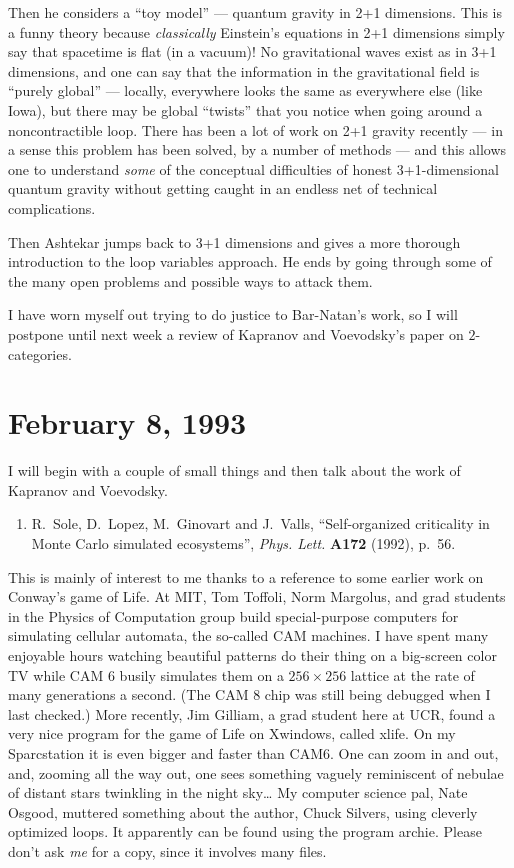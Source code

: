 \documentclass{article}
\def\tightlist{}
\begin{document}
Then he considers a ``toy model'' --- quantum gravity in 2+1 dimensions.
This is a funny theory because \emph{classically} Einstein's equations
in 2+1 dimensions simply say that spacetime is flat (in a vacuum)! No
gravitational waves exist as in 3+1 dimensions, and one can say that the
information in the gravitational field is ``purely global'' --- locally,
everywhere looks the same as everywhere else (like Iowa), but there may
be global ``twists'' that you notice when going around a noncontractible
loop. There has been a lot of work on 2+1 gravity recently --- in a
sense this problem has been solved, by a number of methods --- and this
allows one to understand \emph{some} of the conceptual difficulties of
honest 3+1-dimensional quantum gravity without getting caught in an
endless net of technical complications.

Then Ashtekar jumps back to 3+1 dimensions and gives a more thorough
introduction to the loop variables approach. He ends by going through
some of the many open problems and possible ways to attack them.

I have worn myself out trying to do justice to Bar-Natan's work, so I
will postpone until next week a review of Kapranov and Voevodsky's paper
on \(2\)-categories.



\hypertarget{week4}{%
\section{February 8, 1993}\label{week4}}

I will begin with a couple of small things and then talk about the work
of Kapranov and Voevodsky.

\begin{enumerate}
\def\labelenumi{\arabic{enumi})}
\tightlist
\item
  R.\ Sole, D.\ Lopez, M.\ Ginovart and J.\ Valls, ``Self-organized criticality in Monte Carlo 
  simulated ecosystems'', \emph{Phys. Lett.}
  \textbf{A172} (1992), p.~56.
\end{enumerate}

This is mainly of interest to me thanks to a reference to some earlier
work on Conway's game of Life. At MIT, Tom Toffoli, Norm Margolus, and
grad students in the Physics of Computation group build special-purpose
computers for simulating cellular automata, the so-called CAM machines.
I have spent many enjoyable hours watching beautiful patterns do their
thing on a big-screen color TV while CAM 6 busily simulates them on a
\(256 \times 256\) lattice at the rate of many generations a second.
(The CAM 8 chip was still being debugged when I last checked.) More
recently, Jim Gilliam, a grad student here at UCR, found a very nice
program for the game of Life on Xwindows, called xlife. On my
Sparcstation it is even bigger and faster than CAM6. One can zoom in and
out, and, zooming all the way out, one sees something vaguely
reminiscent of nebulae of distant stars twinkling in the night
sky\ldots{} My computer science pal, Nate Osgood, muttered something
about the author, Chuck Silvers, using
cleverly optimized loops. It apparently can be found using the program
archie. Please don't ask \emph{me} for a copy, since it involves many
files.
\end{document}
